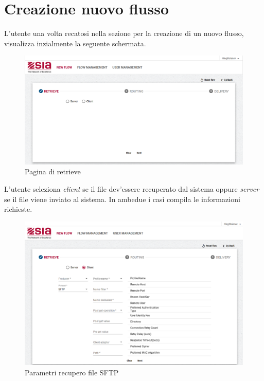 \section{Creazione nuovo flusso}

L'utente una volta recatosi nella sezione per la creazione di un nuovo flusso, visualizza inzialmente la seguente schermata.


\begin{figure}
\begin{center}
\includegraphics[width=1.0\columnwidth]{images/retrieve11.png}
\end{center}
\caption{Pagina di retrieve}
\label{fig:retrieve1}
\end{figure}
\clearpage


L'utente seleziona \textit{client} se il file dev'essere recuperato dal sistema oppure \textit{server} se il file viene inviato al sistema.
In ambedue i casi compila le informazioni richieste.

\begin{figure}
\begin{center}
\includegraphics[width=1.0\columnwidth]{images/retrieve3.png}
\end{center}
\caption{Parametri recupero file SFTP}
\label{fig:cli}
\end{figure}


